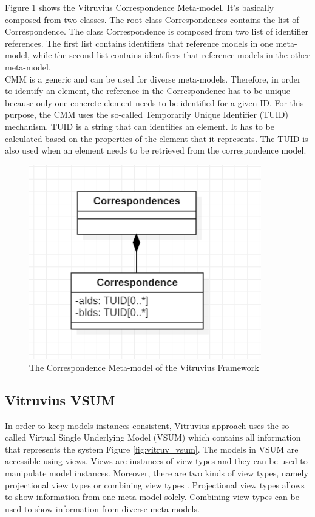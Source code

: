 Figure \ref{fig:correspondence_model} shows the Vitruvius Correspondence Meta-model. It's basically composed from two classes. The root class Correspondences contains the list of Correspondence. The class Correspondence is composed from two list of identifier references. The first list contains identifiers that reference models in one meta-model, while the second list contains identifiers that reference models in the other meta-model.\\

CMM is a generic and can be used for diverse meta-models. Therefore, in order to identify an element, the reference in the Correspondence has to be unique because only one concrete element needs to be identified for a given ID. For this purpose, the CMM uses the so-called Temporarily Unique Identifier (TUID) mechanism. TUID is a string that can identifies an element. It has to be calculated based on the properties of the element that it represents. The TUID is also used when an element needs to be retrieved from the correspondence model.    

\begin{figure}[h]
\centering
\includegraphics[width=0.9\textwidth]{figures/correspondence_model}
\caption{The Correspondence Meta-model of the Vitruvius Framework}
\label{fig:correspondence_model}
\end{figure}



\subsection{Vitruvius VSUM}
\label{sec:Vitruvius VSUM}
In order to keep models instances consistent, Vitruvius approach uses the so-called Virtual Single Underlying Model (VSUM) which contains all information that represents the system Figure \ref{fig:vitruv_vsum}. The models in VSUM are accessible using views. Views are instances of view types and they can be used to manipulate model instances. Moreover, there are two kinds of view types, namely projectional view types or combining view types \cite{burger2013flexible}. Projectional view types allows to show information from one meta-model solely. Combining view types can be used to show information from diverse meta-models.\\

